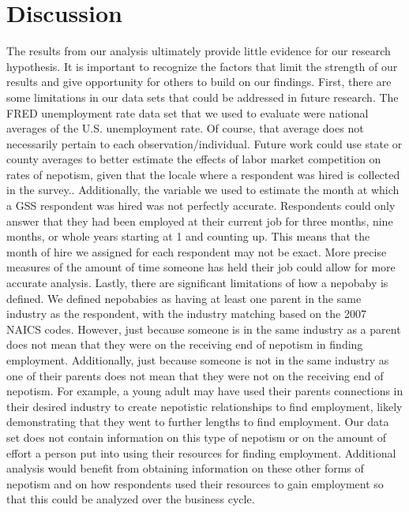 \documentclass[12pt]{article}
\begin{document}
\section{Discussion}
\label{sec:discussion}
The results from our analysis ultimately provide little evidence for our research hypothesis. It is important to recognize the factors that limit the strength of our results and give opportunity for others to build on our findings. First, there are some limitations in our data sets that could be addressed in future research. The FRED unemployment rate data set that we used to evaluate were national averages of the U.S. unemployment rate. Of course, that average does not necessarily pertain to each observation/individual. Future work could use state or county averages to better estimate the effects of labor market competition on rates of nepotism, given that the locale where a respondent was hired is collected in the survey.. Additionally, the variable we used to estimate the month at which a GSS respondent was hired was not perfectly accurate. Respondents could only answer that they had been employed at their current job for three months, nine months, or whole years starting at 1 and counting up. This means that the month of hire we assigned for each respondent may not be exact. More precise measures of the amount of time someone has held their job could allow for more accurate analysis. Lastly, there are significant limitations of how a nepobaby is defined. We defined nepobabies as having at least one parent in the same industry as the respondent, with the industry matching based on the 2007 NAICS codes. However, just because someone is in the same industry as a parent does not mean that they were on the receiving end of nepotism in finding employment. Additionally, just because someone is not in the same industry as one of their parents does not mean that they were not on the receiving end of nepotism. For example, a young adult may have used their parents connections in their desired industry to create nepotistic relationships to find employment, likely demonstrating that they went to further lengths to find employment. Our data set does not contain information on this type of nepotism or on the amount of effort a person put into using their resources for finding employment. Additional analysis would benefit from obtaining information on these other forms of nepotism and on how respondents used their resources to gain employment so that this could be analyzed over the business cycle.
\end{document}
